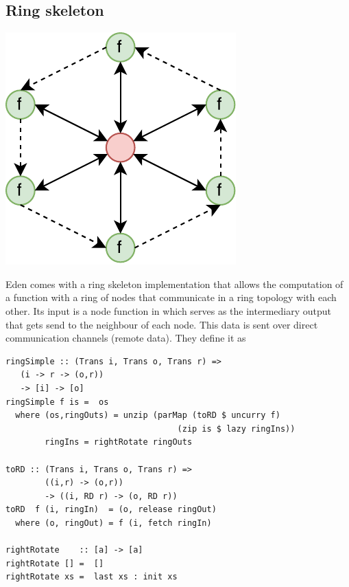 \subsection{Ring skeleton}
\begin{center}
	\includegraphics[scale=0.75]{images/ring}
\end{center}
Eden comes with a ring skeleton implementation that allows the computation of a function \code{[i] -> [o]} with a ring of nodes that communicate in a ring topology with each other. Its input is a node function  in which  serves as the intermediary output that gets send to the neighbour of each node. This data is sent over direct communication channels (remote data). They define it as \citep{eden_skel_topology}
\begin{lstlisting}[frame=htrbl]
ringSimple :: (Trans i, Trans o, Trans r) =>
   (i -> r -> (o,r))
   -> [i] -> [o]
ringSimple f is =  os
  where (os,ringOuts) = unzip (parMap (toRD $ uncurry f)
                                   (zip is $ lazy ringIns))
        ringIns = rightRotate ringOuts

toRD :: (Trans i, Trans o, Trans r) => 
        ((i,r) -> (o,r))
        -> ((i, RD r) -> (o, RD r))
toRD  f (i, ringIn)  = (o, release ringOut)
  where (o, ringOut) = f (i, fetch ringIn)

rightRotate    :: [a] -> [a]
rightRotate [] =  []
rightRotate xs =  last xs : init xs
\end{lstlisting}


